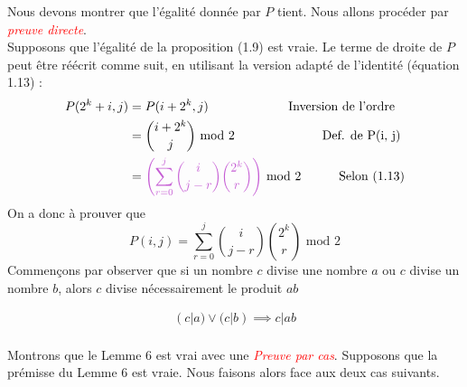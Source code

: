 \documentclass[16pt]{report}
\begin{document}
\begin{multicols*}{2}
        \begin{Preuve*}{}{}
            Nous devons montrer que l'égalité donnée par $P$ tient. Nous allons procéder 
            par \textcolor{red}{\textit{preuve directe}}. 
            \vspace{1em} \\ 
            Supposons que l'égalité de la proposition (1.9) est vraie. 
            Le terme de droite de $P$ peut être réécrit comme suit, en utilisant 
            la version adapté de l'identité (équation 1.13) : 
            \begin{align*}
                P(2^k + i, j)    &= P(i + 2^k, j) 
                                \quad\quad\quad\quad\quad\quad \text{ Inversion de l'ordre } 
                                \\
                                &={i + 2^k \choose j} \text{ mod } 2 \text{ \quad\quad\quad\quad\quad\quad\; 
                Def.  de P(i, j)} 
                \\ 
                              &= \textcolor{myp}{\left( \sum_{r=0}^{j} {i \choose j-r} {2^k \choose r} \right)}
                              \text{ mod } 2 \quad\quad\quad 
                              \text{Selon (1.13)}
            \end{align*}
            On a donc à prouver que 
            \[ P(i, j) = \sum_{r=0}^{j} {i \choose j-r} {2^k \choose r} \text{ mod } 2   \]
            Commençons par observer que si un nombre $c$ divise une nombre $a$ ou 
            $c$ divise un nombre $b$, alors $c$ divise nécessairement le produit 
            $ab$   
            \begin{Lemme}{}{}
                \begin{align*}
                            (c|a) \lor (c|b) \implies c|ab
                \end{align*}
            \end{Lemme}   
            \paragraph{}
            Montrons que le Lemme 6 est vrai avec une \textit{\textcolor{red}{Preuve par cas}}. 
            Supposons que la prémisse du Lemme 6 est vraie. Nous faisons alors face 
            aux deux cas suivants.
            \columnbreak


\end{Preuve*}
\end{multicols*}
\end{document}
